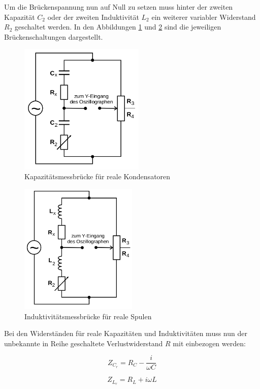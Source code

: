 Um die Brückenspannung nun auf Null zu setzen muss hinter der zweiten
Kapazität $C_2$ oder der zweiten Induktivität $L_2$ ein weiterer
variabler Widerstand $R_2$ geschaltet werden. In den Abbildungen
\ref{fig:KapBr} und \ref{fig:IndBr} sind die jeweiligen Brückenschaltungen
dargestellt.

\newpage

\begin{figure}[h]
  \centering
  \includegraphics[height=6.25cm]{KapBr.png}
  \caption{Kapazitätsmessbrücke für reale Kondensatoren \cite{anleitung}}
  \label{fig:KapBr}
\end{figure}

\begin{figure}[h]
  \centering
  \includegraphics[height=6.25cm]{IndBr.png}
  \caption{Induktivitätsmessbrücke für reale Spulen \cite{anleitung}}
  \label{fig:IndBr}
\end{figure}

Bei den Widerständen für reale Kapazitäten und Induktivitäten muss nun
der unbekannte in Reihe geschaltete Verlustwiderstand $R$ mit einbezogen
werden:

\begin{equation}
  Z_{C_r} = R_C -\frac{i}{\omega C}
\end{equation}

\begin{equation}
  Z_{L_r} = R_L + i \omega L
\end{equation}

